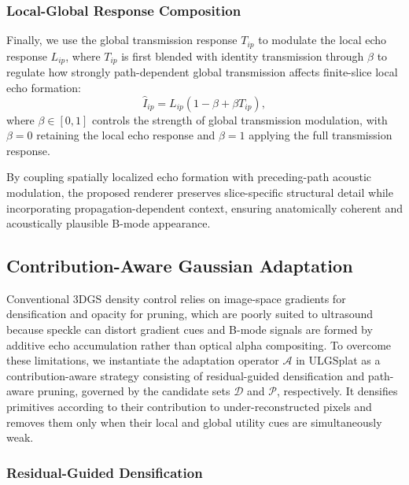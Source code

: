 \subsubsection{Local-Global Response Composition}

Finally, we use the global transmission response $T_{ip}$ to modulate the local
echo response $L_{ip}$, where $T_{ip}$ is first blended with identity
transmission through $\beta$ to regulate how strongly path-dependent global
transmission affects finite-slice local echo formation:
\begin{equation}
\widehat I_{ip}
=
L_{ip}
\left(
1-\beta+\beta T_{ip}
\right),
\label{eq:local-global-composition}
\end{equation}
where $\beta\in[0,1]$ controls the strength of global transmission modulation,
with $\beta=0$ retaining the local echo response and $\beta=1$ applying the
full transmission response. 

By coupling spatially localized echo formation with preceding-path acoustic
modulation, the proposed renderer preserves slice-specific structural detail
while incorporating propagation-dependent context, ensuring anatomically
coherent and acoustically plausible B-mode appearance.

\vspace{-4mm}
\subsection{Contribution-Aware Gaussian Adaptation}
\label{sec:contribution-aware-gaussian-adaptation}

Conventional 3DGS density control relies on image-space gradients for
densification and opacity for pruning, which are poorly suited to ultrasound
because speckle can distort gradient cues and B-mode signals are formed by
additive echo accumulation rather than optical alpha compositing.
To overcome these limitations, we instantiate the adaptation operator
$\mathcal A$ in ULGSplat as a contribution-aware strategy consisting of
residual-guided densification and path-aware pruning, governed by the candidate
sets $\mathcal D$ and $\mathcal P$, respectively. It densifies primitives according
to their contribution to under-reconstructed pixels and removes them only when
their local and global utility cues are simultaneously weak.

\subsubsection{Residual-Guided Densification}

